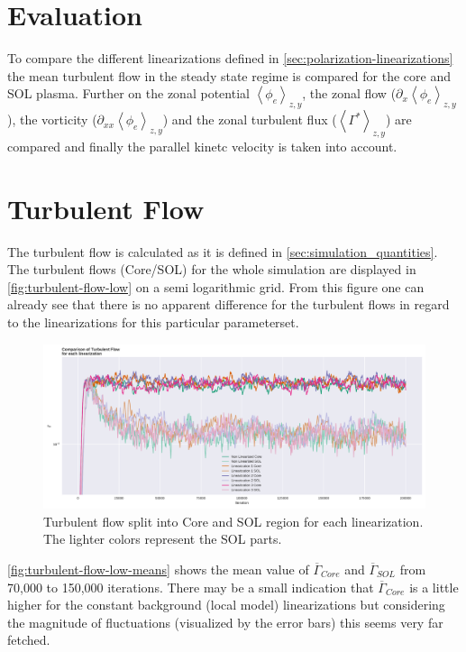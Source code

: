 \documentclass[master.tex]{subfiles}
\newcommand{\meanxy}[1]{\left<#1\right>_{z,y}}
\newcommand{\Tflow}[0]{\overline{\Gamma}}
\begin{document}
\section{Evaluation}
To compare the different linearizations defined in \autoref{sec:polarization-linearizations} the mean turbulent flow in the steady state regime is compared for the core and \ac{SOL} plasma. Further on the zonal potential  $\meanxy{\phi_e}$, the zonal flow ($\partial_x \meanxy{\phi_e}$), the vorticity ($\partial_{xx}\meanxy{\phi_e}$) and the zonal turbulent flux ($\left<\Gamma^*\right>_{z,y}$) are compared and finally the parallel kinetc velocity is taken into account.


\section{Turbulent Flow}
The turbulent flow is calculated as it is defined in \autoref{sec:simulation_quantities}. The turbulent flows (Core/\ac{SOL}) for the whole simulation are displayed in \autoref{fig:turbulent-flow-low} on a semi logarithmic grid. From this figure one can already see that there is no apparent difference for the turbulent flows in regard to the linearizations for this particular parameterset.
\begin{figure}[!htbp]
    \includegraphics[width=\linewidth]{pdfs/turbulent-flow-low.pdf}
    \caption{Turbulent flow split into Core and \ac{SOL} region for each linearization. The lighter colors represent the \ac{SOL} parts.}
    \label{fig:turbulent-flow-low}
\end{figure}
\autoref{fig:turbulent-flow-low-means} shows the mean value of $\Tflow_{Core}$ and $\Tflow_{SOL}$ from 70,000 to 150,000 iterations. There may be a small indication that $\Tflow_{Core}$ is a little higher for the constant background (local model) linearizations but considering the magnitude of fluctuations (visualized by the error bars) this seems very far fetched. 
\end{document}
